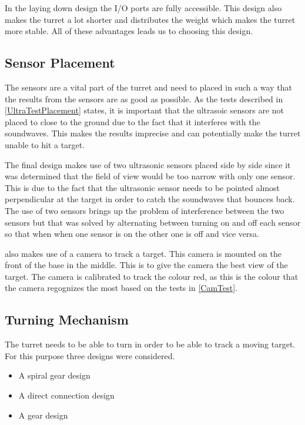 In the laying down design the I/O ports are fully accessible. This design also makes the turret a
lot shorter and distributes the weight which makes the turret more stable. All
of these advantages leads us to choosing this design.

\subsection{Sensor Placement}
The sensors are a vital part of the turret and need to placed in such a way that
the results from the sensors are as good as possible. As the tests described in
\autoref{UltraTestPlacement} states, it is important that the ultrasoic sensors
are not placed to close to the ground due to the fact that it interferes with
the soundwaves. This makes the results imprecise and can potentially make the
turret unable to hit a target.\nl

The final design makes use of two ultrasonic sensors placed side by side since
it was determined that the field of view would be too narrow with only one
sensor. This is due to the fact that the ultrasonic sensor needs to be pointed
almost perpendicular at the target in order to catch the soundwaves that bounces
back. The use of two sensors brings up the problem of interference between the
two sensors but that was solved by alternating between turning on and off each
sensor so that when when one sensor is on the other one is off and vice
versa.\nl

\name also makes use of a camera to track a target. This camera is mounted on
the front of the base in the middle. This is to give the camera the best
view of the target. The camera is calibrated to track the colour red, as this
is the colour that the camera regognizes the most based on the tests in \autoref{CamTest}.

\subsection{Turning Mechanism}
The turret needs to be able to turn in order to be able to track a moving
target. For this purpose three designs were considered. 

\begin{itemize}
  \item A spiral gear design
  \item A direct connection design
  \item A gear design
\end{itemize}

